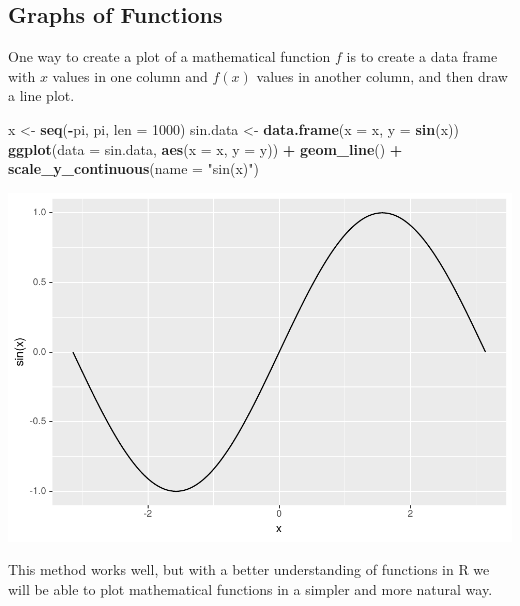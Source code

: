 \documentclass[
]{krantz}
\makeatletter
\newenvironment{Shaded}{\begin{snugshade}}{\end{snugshade}}
\newcommand{\DataTypeTok}[1]{\textcolor[rgb]{0.27,0.27,0.27}{#1}}
\newcommand{\DecValTok}[1]{\textcolor[rgb]{0.06,0.06,0.06}{#1}}
\newcommand{\KeywordTok}[1]{\textcolor[rgb]{0.27,0.27,0.27}{\textbf{#1}}}
\newcommand{\NormalTok}[1]{#1}
\newcommand{\OperatorTok}[1]{\textcolor[rgb]{0.43,0.43,0.43}{\textbf{#1}}}
\newcommand{\StringTok}[1]{\textcolor[rgb]{0.5,0.5,0.5}{#1}}
\newenvironment{kframe}{%
\medskip{}
\setlength{\fboxsep}{.8em}
 \def\at@end@of@kframe{}%
 \ifinner\ifhmode%
  \def\at@end@of@kframe{\end{minipage}}%
  \begin{minipage}{\columnwidth}%
 \fi\fi%
 \def\FrameCommand##1{\hskip\@totalleftmargin \hskip-\fboxsep
 \colorbox{shadecolor}{##1}\hskip-\fboxsep
     \hskip-\linewidth \hskip-\@totalleftmargin \hskip\columnwidth}%
 \MakeFramed {\advance\hsize-\width
   \@totalleftmargin\z@ \linewidth\hsize
   \@setminipage}}%
 {\par\unskip\endMakeFramed%
 \at@end@of@kframe}
\renewenvironment{Shaded}{\begin{kframe}}{\end{kframe}}
\makeatother
\begin{document}
\hypertarget{graphs-of-functions}{%
\subsection{Graphs of Functions}\label{graphs-of-functions}}

One way to create a plot of a mathematical function \(f\) is to create a data frame with \(x\) values in one column and \(f(x)\) values in another column, and then draw a line plot.

\begin{Shaded}
\begin{Highlighting}[]
\NormalTok{x \textless{}{-}}\StringTok{ }\KeywordTok{seq}\NormalTok{(}\OperatorTok{{-}}\NormalTok{pi, pi, }\DataTypeTok{len =} \DecValTok{1000}\NormalTok{)}
\NormalTok{sin.data \textless{}{-}}\StringTok{ }\KeywordTok{data.frame}\NormalTok{(}\DataTypeTok{x =}\NormalTok{ x, }\DataTypeTok{y =} \KeywordTok{sin}\NormalTok{(x))}
\KeywordTok{ggplot}\NormalTok{(}\DataTypeTok{data =}\NormalTok{ sin.data, }\KeywordTok{aes}\NormalTok{(}\DataTypeTok{x =}\NormalTok{ x, }\DataTypeTok{y =}\NormalTok{ y)) }\OperatorTok{+}\StringTok{ }\KeywordTok{geom\_line}\NormalTok{() }\OperatorTok{+}\StringTok{ }
\StringTok{    }\KeywordTok{scale\_y\_continuous}\NormalTok{(}\DataTypeTok{name =} \StringTok{"sin(x)"}\NormalTok{)}
\end{Highlighting}
\end{Shaded}

\includegraphics{bookdown_files/figure-latex/unnamed-chunk-82-1.pdf}

This method works well, but with a better understanding of functions in R we will be able to plot mathematical functions in a simpler and more natural way.
\end{document}
